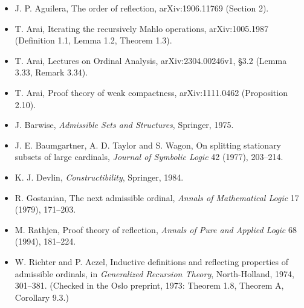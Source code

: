 \documentclass[11pt]{article}
\begin{document}
\begin{itemize}
\item J. P. Aguilera, The order of reflection, arXiv:1906.11769 (Section 2).
\item T. Arai, Iterating the recursively Mahlo operations, arXiv:1005.1987 (Definition 1.1, Lemma 1.2, Theorem 1.3).
\item T. Arai, Lectures on Ordinal Analysis, arXiv:2304.00246v1, \S3.2 (Lemma 3.33, Remark 3.34).
\item T. Arai, Proof theory of weak compactness, arXiv:1111.0462 (Proposition 2.10).
\item J. Barwise, \emph{Admissible Sets and Structures}, Springer, 1975.
\item J. E. Baumgartner, A. D. Taylor and S. Wagon, On splitting stationary subsets of large cardinals,
  \emph{Journal of Symbolic Logic} 42 (1977), 203--214.
\item K. J. Devlin, \emph{Constructibility}, Springer, 1984.
\item R. Gostanian, The next admissible ordinal, \emph{Annals of Mathematical Logic} 17 (1979), 171--203.
\item M. Rathjen, Proof theory of reflection, \emph{Annals of Pure and Applied Logic} 68 (1994), 181--224.
\item W. Richter and P. Aczel, Inductive definitions and reflecting properties of admissible ordinals, in
  \emph{Generalized Recursion Theory}, North-Holland, 1974, 301--381. (Checked in the Oslo preprint, 1973: Theorem 1.8,
  Theorem A, Corollary 9.3.)
\end{itemize}
\end{document}
